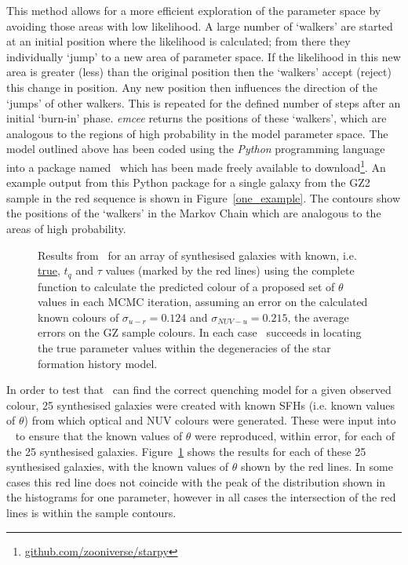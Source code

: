 This method allows for a more efficient exploration of the parameter space by avoiding those areas with low likelihood. A large number of `walkers' are started at an initial position where the likelihood is calculated; from there they individually `jump' to a new area of parameter space. If the likelihood in this new area is greater (less) than the original position then the `walkers' accept (reject) this change in position. Any new position then influences the direction of the  `jumps' of other walkers. This is repeated for the defined number of steps after an initial `burn-in' phase. \emph{emcee} returns the positions of these `walkers', which are analogous to the regions of high probability in the model parameter space. The model outlined above has been coded using the \emph{Python} programming language into a package named \starpy ~which has been made freely available to download\footnote{\url{github.com/zooniverse/starpy}}. An example output from this Python package for a single galaxy from the GZ2 sample in the red sequence is shown in Figure~\ref{one_example}. The contours show the positions of the `walkers' in the Markov Chain which are analogous to the areas of high probability.

\begin{figure}
\caption[Testing \starpy]{Results from \starpy ~for an array of synthesised galaxies with known, i.e. \underline{true}, $t_q$ and $\tau$ values (marked by the red lines) using the complete function to calculate the predicted colour of a proposed set of $\theta$ values in each MCMC iteration, assuming an error on the calculated known colours of $\sigma_{u-r} = 0.124$ and $\sigma_{NUV-u} = 0.215$, the average errors on the GZ sample colours. In each case \starpy ~succeeds in locating the true parameter values within the degeneracies of the star formation history model.}
\label{test_mosaic}
\end{figure}

In order to test that \starpy ~can find the correct quenching model for a given observed colour, 25 synthesised galaxies were created with known SFHs (i.e. known values of $\theta$) from which optical and NUV colours were generated. These were input into \starpy ~ to ensure that the known values of $\theta$ were reproduced, within error, for each of the 25 synthesised galaxies. Figure~\ref{test_mosaic} shows the results for each of these 25 synthesised galaxies, with the known values of $\theta$ shown by the red lines. In some cases this red line does not coincide with the peak of the distribution shown in the histograms for one parameter, however in all cases the intersection of the red lines is within the sample contours. 

